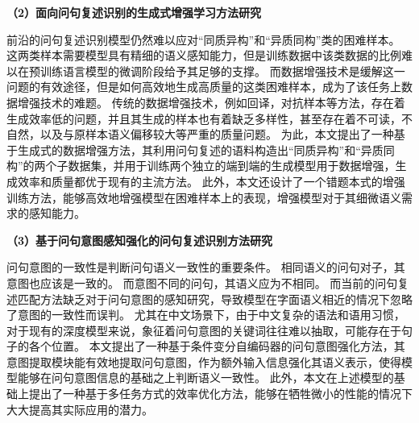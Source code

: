 \textbf{\songti （2）面向问句复述识别的生成式增强学习方法研究}

前沿的问句复述识别模型仍然难以应对“同质异构”和“异质同构”类的困难样本。
这两类样本需要模型具有精细的语义感知能力，但是训练数据中该类数据的比例难以在预训练语言模型的微调阶段给予其足够的支撑。
而数据增强技术是缓解这一问题的有效途径，但是如何高效地生成高质量的这类困难样本，成为了该任务上数据增强技术的难题。
传统的数据增强技术，例如回译，对抗样本等方法，存在着生成效率低的问题，并且其生成的样本也有着缺乏多样性，甚至存在着不可读，不自然，以及与原样本语义偏移较大等严重的质量问题。
为此，本文提出了一种基于生成式的数据增强方法，其利用问句复述的语料构造出“同质异构”和“异质同构”的两个子数据集，并用于训练两个独立的端到端的生成模型用于数据增强，生成效率和质量都优于现有的主流方法。
此外，本文还设计了一个错题本式的增强训练方法，能够高效地增强模型在困难样本上的表现，增强模型对于其细微语义需求的感知能力。

\textbf{\songti （3）基于问句意图感知强化的问句复述识别方法研究}

问句意图的一致性是判断问句语义一致性的重要条件。
相同语义的问句对子，其意图也应该是一致的。
而意图不同的问句，其语义应为不相同。
而当前的问句复述匹配方法缺乏对于问句意图的感知研究，导致模型在字面语义相近的情况下忽略了意图的一致性而误判。
尤其在中文场景下，由于中文复杂的语法和语用习惯，对于现有的深度模型来说，象征着问句意图的关键词往往难以抽取，可能存在于句子的各个位置。
本文提出了一种基于条件变分自编码器的问句意图强化方法，其意图提取模块能有效地提取问句意图，作为额外输入信息强化其语义表示，使得模型能够在问句意图信息的基础之上判断语义一致性。
此外，本文在上述模型的基础上提出了一种基于多任务方式的效率优化方法，能够在牺牲微小的性能的情况下大大提高其实际应用的潜力。


